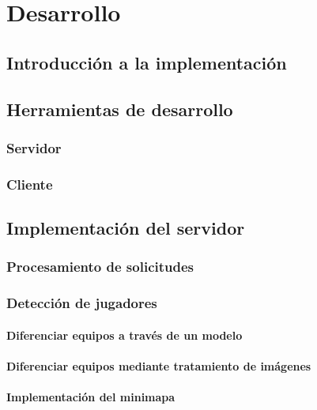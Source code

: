 \chapter{Desarrollo}

\section{Introducción a la implementación}

\section{Herramientas de desarrollo}

\subsection{Servidor}

\subsection{Cliente}

\section{Implementación del servidor}

\subsection{Procesamiento de solicitudes}

\subsection{Detección de jugadores}

\subsubsection{Diferenciar equipos a través de un modelo}

\subsubsection{Diferenciar equipos mediante tratamiento de imágenes}

\subsubsection{Implementación del minimapa}

